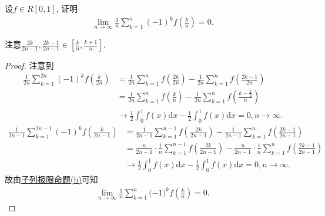 \documentclass[../../main.tex]{subfiles}%
\begin{document}
\begin{example}
设$f \in R[0,1]$, 证明
\begin{align*}
\lim_{n \to \infty} \frac{1}{n} \sum_{k=1}^{n} (-1)^k f\left( \frac{k}{n} \right) = 0.
\end{align*}
\end{example}
\begin{note}
注意$\frac{2k}{2n-1},\frac{2k-1}{2n-1}\in \left[ \frac{k}{n},\frac{k+1}{n} \right]$.
\end{note}
\begin{proof}
注意到
\begin{align*}
\frac{1}{2n}\sum_{k=1}^{2n}{\left( -1 \right) ^kf\left( \frac{k}{2n} \right)}&=\frac{1}{2n}\sum_{k=1}^n{f\left( \frac{2k}{2n} \right)}-\frac{1}{2n}\sum_{k=1}^n{f\left( \frac{2k-1}{2n} \right)}\\
&=\frac{1}{2n}\sum_{k=1}^n{f\left( \frac{k}{n} \right)}-\frac{1}{2n}\sum_{k=1}^n{f\left( \frac{k-\frac{1}{2}}{n} \right)}\\
&\rightarrow \frac{1}{2}\int_0^1{f\left( x \right) \mathrm{d}x}-\frac{1}{2}\int_0^1{f\left( x \right) \mathrm{d}x}=0,n\rightarrow \infty .
\end{align*}
\begin{align*}
\frac{1}{2n-1}\sum_{k=1}^{2n-1}{\left( -1 \right) ^kf\left( \frac{k}{2n-1} \right)}&=\frac{1}{2n-1}\sum_{k=1}^{n-1}{f\left( \frac{2k}{2n-1} \right)}-\frac{1}{2n-1}\sum_{k=1}^n{f\left( \frac{2k-1}{2n-1} \right)}\\
&=\frac{n}{2n-1}\cdot \frac{1}{n}\sum_{k=1}^{n-1}{f\left( \frac{2k}{2n-1} \right)}-\frac{n}{2n-1}\cdot \frac{1}{n}\sum_{k=1}^n{f\left( \frac{2k-1}{2n-1} \right)}\\
&\rightarrow \frac{1}{2}\int_0^1{f\left( x \right) \mathrm{d}x}-\frac{1}{2}\int_0^1{f\left( x \right) \mathrm{d}x}=0,n\rightarrow \infty .
\end{align*}
故由\hyperref[proposition:子列极限命题]{子列极限命题(b)}可知
\begin{align*}
\lim_{n\rightarrow \infty} \frac{1}{n}\sum_{k=1}^n{(}-1)^kf\left( \frac{k}{n} \right) =0.
\end{align*}
\end{proof}
\end{document}
